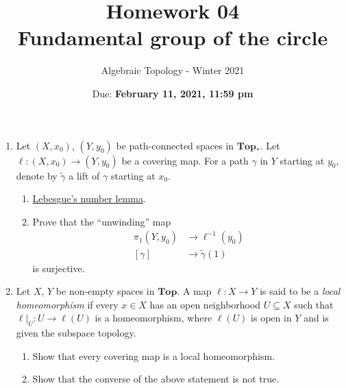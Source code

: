 \documentclass{article}
\title{Homework 04 \\ Fundamental group of the circle}
\author{Algebraic Topology - Winter 2021}
\date{Due: \textbf{February 11, 2021, 11:59 pm}}
\begin{document}
\maketitle

\begin{enumerate}
    \item 
    Let $(X,x_0)$, $(Y,y_0)$ be path-connected spaces in $\mathbf{Top}_*$.
    Let $\ell: (X,x_0) \to (Y,y_0)$ be a covering map. For a path $\gamma$ in $Y$ starting at $y_0$, denote by $\widetilde{\gamma}$ a lift of $\gamma$ starting at $x_0$.
    \begin{enumerate}
        \item
        \href{https://en.wikipedia.org/wiki/Lebesgue\%27s_number_lemma}{Lebesgue's number lemma}.
        \item Prove that the ``unwinding'' map 
        \begin{align*}
            \pi_1(Y,y_0) & \to \ell^{-1}(y_0) \\ 
            [\gamma] &\to \widetilde{\gamma}(1)
        \end{align*}
        is surjective.
    \end{enumerate}
    
    \item 
    Let $X$, $Y$ be non-empty spaces in $\mathbf{Top}$. A map $\ell: X \to Y$ is said to be a \emph{local homeomorphism} if every $x \in X$ has an open neighborhood $U \subseteq X$ such that $\ell |_U : U \to \ell(U)$ is a homeomorphism, where $\ell(U)$ is open in $Y$ and is given the subspace topology. 
    \begin{enumerate}
        \item Show that every covering map is a local homeomorphism.
        \item Show that the converse of the above statement is not true.
    \end{enumerate}
    

\end{enumerate}
\end{document}
